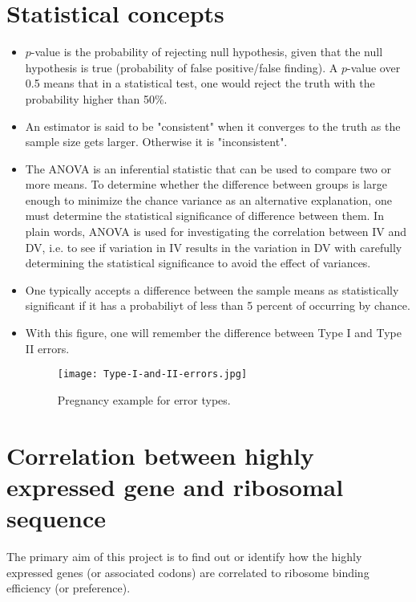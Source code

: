 \documentclass[paper=a4, fontsize=12pt]{scrartcl}	%
\numberwithin{equation}{section}					%
\numberwithin{figure}{section}					%
\numberwithin{table}{section}					%
\begin{document}
\section{Statistical concepts}

\begin{itemize}
\item $p$-value is the probability of rejecting null hypothesis, given that the null hypothesis is true (probability of false positive/false finding). A $p$-value over 0.5 means that in a statistical test, one would reject the truth with the probability higher than 50\%. 
\item An estimator is said to be "consistent" when it converges to the truth as the sample size gets larger. Otherwise it is "inconsistent".
\item The ANOVA is an inferential statistic that can be used to compare two or more means. To determine whether the difference between groups is large enough to minimize the chance variance as an alternative explanation, one must determine the statistical significance of difference between them. In plain words, ANOVA is used for investigating the correlation between IV and DV, i.e. to see if variation in IV results in the variation in DV with carefully determining the statistical significance to avoid the effect of variances. 
\item One typically accepts a difference between the sample means as statistically significant if it has a probabiliyt of less than 5 percent of occurring by chance.  

\item With this figure, one will remember the difference between Type I and Type II errors. 
\begin{figure}
\centering
\texttt{[image: Type-I-and-II-errors.jpg]}
\caption{Pregnancy example for error types.}
\label{fig:type-errors}
\end{figure}

\end{itemize}

\section*{Correlation between highly expressed gene and ribosomal sequence}

The primary aim of this project is to find out or identify how the highly expressed genes (or associated codons) are correlated to ribosome binding efficiency (or preference). 
\end{document}
